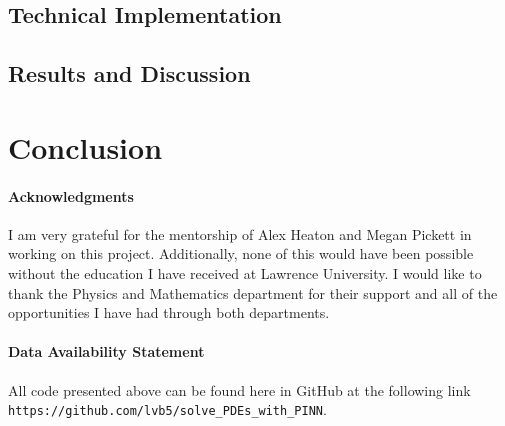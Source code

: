 \documentclass{CUP-JNL-DTM}%
\theoremstyle{definition}
\numberwithin{equation}{section}
\begin{document}
\subsection{Technical Implementation}

\subsection{Results and Discussion}


\section{Conclusion}


\begin{Backmatter}

\paragraph{Acknowledgments}

I am very grateful for the mentorship of Alex Heaton and Megan Pickett in working on this project. Additionally, none of this would have been possible without the education I have received at Lawrence University. I would like to thank the Physics and Mathematics department for their support and all of the opportunities I have had through both departments. 

\paragraph{Data Availability Statement} All code presented above can be found here in GitHub at the following link \texttt{https://github.com/lvb5/solve\_PDEs\_with\_PINN}. 




\end{Backmatter}
\end{document}
